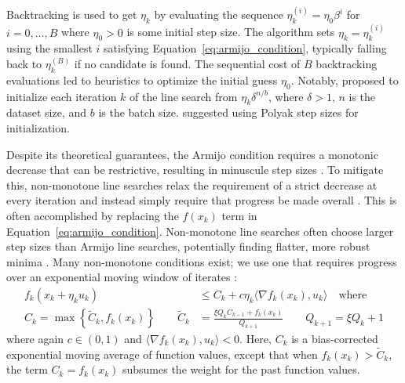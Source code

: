 \documentclass{article}
\newcommand{\tocite}[1]{{\color{Maroon} (cite: #1)}}
\newcommand{\xAt}[1]{x_{#1}}
\newcommand{\update}{u}
\newcommand{\updateAt}[1]{\update_{#1}}
\newcommand{\stepSize}{\eta}
\newcommand{\stepSizeInit}{\eta_0}
\newcommand{\stepSizeAt}[1]{\stepSize_{#1}}
\newcommand{\inner}[2]{\langle #1, #2 \rangle}
\begin{document}
Backtracking is used to get $\stepSizeAt{k}$ by evaluating the sequence $\stepSizeAt{k}^{(i)} = \stepSizeInit \beta^i$ for $i = 0, \dots, B$ where $\stepSize_0 > 0$ is some initial step size. The algorithm sets $\stepSizeAt{k} = \stepSizeAt{k}^{(i)}$ using the smallest $i$ satisfying Equation~\ref{eq:armijo_condition}, typically falling back to $\stepSizeAt{k}^{(B)}$ if no candidate is found. The sequential cost of $B$ backtracking evaluations led to heuristics to optimize the initial guess $\stepSizeInit$. Notably, \cite{vaswani2019painless} proposed to initialize each iteration $k$ of the line search from $\stepSizeAt{k} \delta^{n/b}$, where $\delta > 1$, $n$ is the dataset size, and $b$ is the batch size. \cite{galli2023monotone} suggested using Polyak step sizes for initialization.


Despite its theoretical guarantees, the Armijo condition requires a monotonic decrease that can be restrictive, resulting in minuscule step sizes \citep{nocedal2006numerical}.
To mitigate this, non-monotone line searches relax the
requirement of a strict decrease at every iteration and instead simply require that progress be made overall
\citep{zhang2004nonmonotone,galli2023monotone,fox2024nonmonotone,grippo1986nonmonotone,dai2002nonmonotone,huynh1993nonmonotone,ernesto2000nonmonotone}. This is often accomplished by replacing the $f(\xAt{k})$ term in
Equation~\ref{eq:armijo_condition}. Non-monotone line searches often choose larger step sizes than Armijo line searches, potentially finding flatter, more robust minima \citep{fox2024nonmonotone}.
Many non-monotone conditions exist; we use one that requires progress over an exponential moving window of iterates \citep{zhang2004nonmonotone,galli2023monotone}:
%
\begin{equation}
	\begin{split}
		f_k(\xAt{k} + \stepSizeAt{k} \updateAt{k}) &\le C_k + c \stepSizeAt{k} \inner{\nabla f_k(\xAt{k})}{\updateAt{k}} 
		\quad \text{where} \\
			C_k = \max \left\{ \tilde C_k, f_k(x_k) \right\} \qquad
			\tilde C_k &= \frac{\xi Q_k C_{k-1} + f_k(x_k)}{Q_{k+1}} \qquad 
			Q_{k + 1} = \xi Q_k + 1
	\end{split}
	\label{eq:nonmonotone_condition}
\end{equation}
%
where again $c \in (0, 1)$ and $\inner{\nabla f_k(\xAt{k})}{\updateAt{k}} < 0$. Here, $C_k$ is a bias-corrected exponential moving average of function values, except that
when $f_k(\xAt{k}) > \tilde C_k$, the term $C_k = f_k(\xAt{k})$ subsumes the weight for the past function values. 
\end{document}
